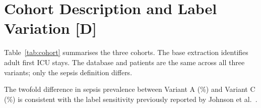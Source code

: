 

\section{Cohort Description and Label Variation \texorpdfstring{[D]}{[D]}}
\label{sec:cohort_results}

Table~\ref{tab:cohort} summarises the three cohorts. The base extraction
identifies \pcNStays{} adult first ICU stays. The database and patients are the
same across all three variants; only the sepsis definition differs.

\begin{table}[H]
    \centering\small
    \caption{Cohort description by label variant. ``Deaths, no sepsis'' counts
    stays ending in death with no labelled sepsis onset before it, so it varies
    with the label. The Liberal variant's wider antibiotic-culture windows and
    rolling SOFA baseline identify about twice as many cases. Onsets are counted
    \textbf{cohort-wide, at any hour of the stay}; the subset inside the 72-hour
    modelling horizon (\pcNPositiveA, \pcNPositiveBPanel{} and \pcNPositiveC),
    on which the models are trained and evaluated, is reported in
    Table~\ref{tab:label_agreement}.}
    \label{tab:cohort}
\end{table}

The twofold difference in sepsis prevalence between Variant A
(\pcPctOnsetsA\%) and Variant C (\pcPctOnsetsC\%) is consistent with the label
sensitivity previously reported by Johnson et al.\ \cite{johnson2018comparative}.
